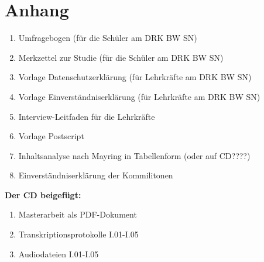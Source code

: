 \section{Anhang}
\label{sec:Anhang}

\begin{enumerate}
	\item Umfragebogen (für die Schüler am DRK BW SN)
	\item Merkzettel zur Studie (für die Schüler am DRK BW SN)
	\item Vorlage Datenschutzerklärung (für Lehrkräfte am DRK BW SN)
	\item Vorlage Einverständniserklärung (für Lehrkräfte am DRK BW SN)
	\item Interview-Leitfaden für die Lehrkräfte
	\item Vorlage Postscript
	\item Inhaltsanalyse nach Mayring in Tabellenform (oder auf CD????)
	\item Einverständniserklärung der Kommilitonen\\[1.5cm]
\end{enumerate}


\textbf{Der CD beigefügt:}
\begin{enumerate}
	\item Masterarbeit als PDF-Dokument
	\item Transkriptionsprotokolle I.01-I.05
	\item Audiodateien I.01-I.05
\end{enumerate}









\listoffigures
